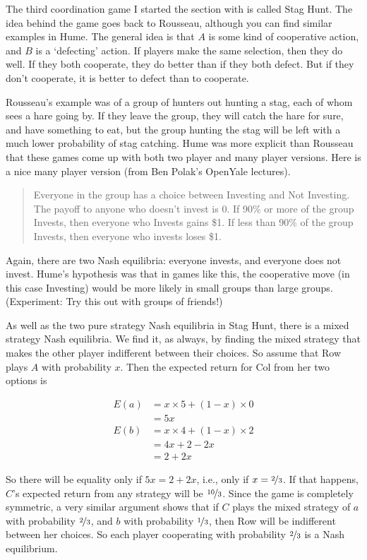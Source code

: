 \documentclass[openany]{book}
\begin{document}
The third coordination game I started the section with is called Stag Hunt. The idea behind the game goes back to Rousseau, although you can find similar examples in Hume. The general idea is that $A$ is some kind of cooperative action, and $B$ is a `defecting' action. If players make the same selection, then they do well. If they both cooperate, they do better than if they both defect. But if they don't cooperate, it is better to defect than to cooperate.

Rousseau's example was of a group of hunters out hunting a stag, each of whom sees a hare going by. If they leave the group, they will catch the hare for sure, and have something to eat, but the group hunting the stag will be left with a much lower probability of stag catching. Hume was more explicit than Rousseau that these games come up with both two player and many player versions. Here is a nice many player version (from Ben Polak's OpenYale lectures).

\begin{quote}
Everyone in the group has a choice between Investing and Not Investing. The payoff to anyone who doesn't invest is 0. If 90\% or more of the group Invests, then everyone who Invests gains \$1. If less than 90\% of the group Invests, then everyone who invests loses \$1.
\end{quote}

\noindent Again, there are two Nash equilibria: everyone invests, and everyone does not invest. Hume's hypothesis was that in games like this, the cooperative move (in this case Investing) would be more likely in small groups than large groups. (Experiment: Try this out with groups of friends!)

As well as the two pure strategy Nash equilibria in Stag Hunt, there is a mixed strategy Nash equilibria. We find it, as always, by finding the mixed strategy that makes the other player indifferent between their choices. So assume that Row plays $A$ with probability $x$. Then the expected return for Col from her two options is

\begin{align*}
E(a) &= x \times 5 + (1-x) \times 0 \\
 &= 5x \\
E(b) &= x \times 4 + (1-x) \times 2 \\
 &= 4x + 2 - 2x \\
 &= 2 + 2x
\end{align*}

\noindent So there will be equality only if $5x = 2 + 2x$, i.e., only if $x = \nicefrac{2}{3}$. If that happens, $C$'s expected return from any strategy will be $\nicefrac{10}{3}$. Since the game is completely symmetric, a very similar argument shows that if $C$ plays the mixed strategy of $a$ with probability $\nicefrac{2}{3}$, and $b$ with probability $\nicefrac{1}{3}$, then Row will be indifferent between her choices. So each player cooperating with probability $\nicefrac{2}{3}$ is a Nash equilibrium. 
\end{document}
